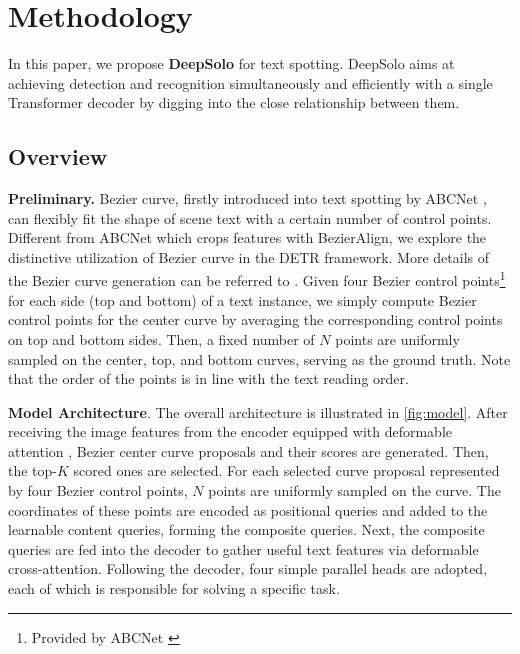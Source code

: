 \documentclass[10pt,twocolumn,letterpaper]{article}
\begin{document}
\section{Methodology}
\label{sec:method}
In this paper, we propose \textbf{DeepSolo} for text spotting. DeepSolo aims at achieving detection and recognition simultaneously and efficiently with a single Transformer decoder by digging into the close relationship between them.

\subsection{Overview}
\label{sec:overview}
\noindent\textbf{Preliminary.} Bezier curve, firstly introduced into text spotting by ABCNet \cite{liu2020abcnet}, can flexibly fit the shape of scene text with a certain number of control points. Different from ABCNet which crops features with BezierAlign, we explore the distinctive utilization of Bezier curve in the DETR framework. More details of the Bezier curve generation can be referred to \cite{liu2020abcnet, liu2021abcnet}. Given four Bezier control points\footnote{Provided by ABCNet \cite{liu2020abcnet}} for each side (top and bottom) of a text instance, we simply compute Bezier control points for the center curve by averaging the corresponding control points on top and bottom sides. Then, a fixed number of $N$ points are uniformly sampled on the center, top, and bottom curves, serving as the ground truth. Note that the order of the points is in line with the text reading order.

\noindent\textbf{Model Architecture}. The overall architecture is illustrated in \cref{fig:model}. After receiving the image features from the encoder equipped with deformable attention \cite{zhu2020deformable}, Bezier center curve proposals and their scores are generated. Then, the top-$K$ scored ones are selected. For each selected curve proposal represented by four Bezier control points, $N$ points are uniformly sampled on the curve. The coordinates of these points are encoded as positional queries and added to the learnable content queries, forming the composite queries. Next, the composite queries are fed into the decoder to gather useful text features via deformable cross-attention. Following the decoder, four simple parallel heads are adopted, each of which is responsible for solving a specific task. 
\end{document}

